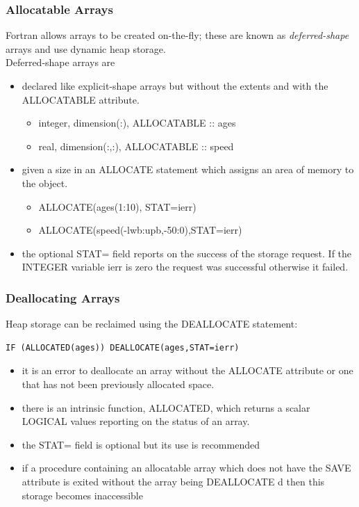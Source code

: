 \documentclass[11pt]{beamer}
\begin{document}
\begin{frame}[fragile]
\frametitle{Allocatable Arrays}

\footnotesize{
Fortran allows arrays to be created on-the-fly; these are known as \emph{deferred-shape} arrays and use dynamic heap storage. \\
Deferred-shape arrays are
\begin{itemize}
\item declared like explicit-shape arrays but without the extents and with the ALLOCATABLE attribute.
\begin{itemize}
\item integer, dimension(:), ALLOCATABLE :: ages
\item real, dimension(:,:), ALLOCATABLE :: speed
 \end{itemize}
 \item given a size in an ALLOCATE statement which assigns an area of memory to the object.
\begin{itemize}
\item ALLOCATE(ages(1:10), STAT=ierr)
\item ALLOCATE(speed(-lwb:upb,-50:0),STAT=ierr)
 \end{itemize}
\item the optional STAT= field reports on the success of the storage request. If the INTEGER variable ierr is zero the request was successful otherwise it failed. 
 \end{itemize}
}

\end{frame}

\begin{frame}[fragile]
\frametitle{Deallocating Arrays}

\footnotesize{
Heap storage can be reclaimed using the DEALLOCATE statement:
 \begin{lstlisting}[style=Fortran]
IF (ALLOCATED(ages)) DEALLOCATE(ages,STAT=ierr)
 \end{lstlisting}

\begin{itemize}
\item it is an error to deallocate an array without the ALLOCATE attribute or one that has not been previously allocated space.
\item there is an intrinsic function, ALLOCATED, which returns a scalar LOGICAL values reporting on the status of an array. 
\item the STAT= field is optional but its use is recommended
\item if a procedure containing an allocatable array which does not have the SAVE attribute is exited without the array being DEALLOCATE d then this storage becomes inaccessible
 \end{itemize}
}

\end{frame}
\end{document}

